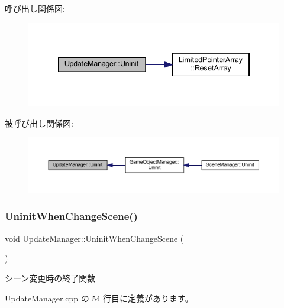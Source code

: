 呼び出し関係図\+:
\nopagebreak
\begin{figure}[H]
\begin{center}
\leavevmode
\includegraphics[width=334pt]{class_update_manager_a389f9047e882de587eb4def0c691909d_cgraph}
\end{center}
\end{figure}
被呼び出し関係図\+:
\nopagebreak
\begin{figure}[H]
\begin{center}
\leavevmode
\includegraphics[width=350pt]{class_update_manager_a389f9047e882de587eb4def0c691909d_icgraph}
\end{center}
\end{figure}
\mbox{\label{class_update_manager_a2e0a6b1a620ba620783d929e532b6148}} 
\subsubsection{\texorpdfstring{Uninit\+When\+Change\+Scene()}{UninitWhenChangeScene()}}
{\footnotesize\ttfamily void Update\+Manager\+::\+Uninit\+When\+Change\+Scene (\begin{DoxyParamCaption}{ }\end{DoxyParamCaption})}



シーン変更時の終了関数 



 Update\+Manager.\+cpp の 54 行目に定義があります。

